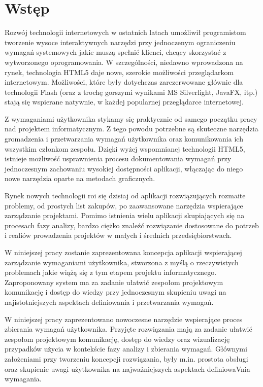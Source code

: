 \chapter{Wstęp}

    Rozwój technologii internetowych w ostatnich latach umożliwił programistom tworzenie wysoce interaktywnych narzędzi przy jednoczenym ograniczeniu wymagań systemowych jakie muszą spełnić klienci, chcący skorzystać z wytworzonego oprogramowania. W szczególności, niedawno wprowadzona na rynek, technologia HTML5 daje nowe, szerokie możliwości przeglądarkom internetowym. Możliwości, które były dotychczas zarezerwowane głównie dla technologii Flash (oraz z trochę gorszymi wynikami MS Silverlight, JavaFX, itp.) stają się wspierane natywnie, w każdej popularnej przeglądarce internetowej. 

    Z wymaganiami użytkownika stykamy się praktycznie od samego początku pracy nad projektem informatycznym. Z tego powodu potrzebne są skuteczne narzędzia gromadzenia i przetwarzania wymagań użytkownika oraz komunikowania ich wszystkim członkom zespołu. Dzięki wyżej wspomnianej technologii HTML5, istnieje możliwość usprawnienia procesu dokumentowania wymagań przy jednoczesnym zachowaniu wysokiej dostępności aplikacji, włączając do niego nowe narzędzia oparte na metodach graficznych. 

    Rynek nowych technologii roi się dzisiaj od aplikacji rozwiązujących rozmaite problemy, od prostych list zakupów, po zaawansowane narzędzia wspierające zarządzanie projektami. Pomimo istnienia wielu aplikacji skupiających się na procesach fazy analizy, bardzo ciężko znaleźć rozwiązanie dostosowane do potrzeb i realiów prowadzenia projektów w małych i średnich przedsiębiorstwach. 
          
    W niniejszej pracy zostanie zaprezentowana koncepcja aplikacji wspierającej zarządzanie wymaganiami użytkownika, stworzona z myślą o rzeczywistych problemach jakie wiążą się z tym etapem projektu informatycznego. Zaproponowany system ma za zadanie ułatwić zespołom projektowym komunikację i dostęp do wiedzy przy jednoczesnym skupieniu uwagi na najistotniejszych aspektach definiowania i przetwarzania wymagań. 

    W niniejszej pracy zaprezentowano nowoczesne narzędzie wspierające proces zbierania wymagań użytkownika. Przyjęte rozwiązania mają za zadanie ułatwić zespołom projektowym komunikację, dostęp do wiedzy oraz wizualizację przypadków użycia w kontekście fazy analizy i zbierania wymagań. Głównymi założeniami przy tworzeniu koncepcji rozwiązania, były m.in. prostota obsługi oraz skupienie uwagi użytkownika na najważniejszych aspektach definiowaVnia wymagania. 


